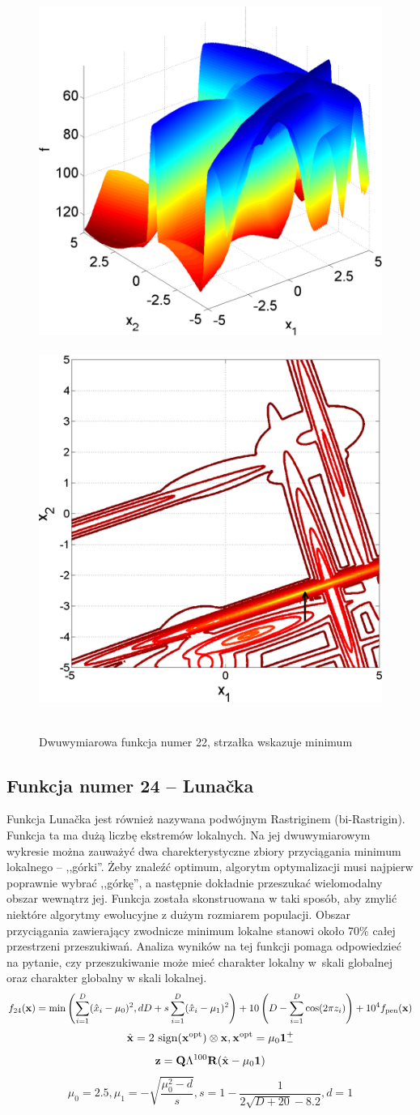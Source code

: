 \documentclass[a4paper,onecolumn,oneside,12pt,wide,floatssmall]{mwrep}
\theoremstyle{definition}
\theoremstyle{plain}%
\theoremstyle{remark}
\begin{document}
\begin{figure}[H]
\centering
\mbox{
\includegraphics[width=.45\textwidth]{img/22.png} \quad
\includegraphics[width=.45\textwidth]{img/22a.png} 
}
\caption{Dwuwymiarowa funkcja numer 22, strzałka wskazuje minimum \cite{noiseless}}
\end{figure}

\subsection{Funkcja numer 24 -- Lunačka}

Funkcja Lunačka jest również nazywana podwójnym Rastriginem (bi-Rastrigin). Funkcja ta ma dużą liczbę ekstremów lokalnych. 
Na jej dwuwymiarowym wykresie można zauważyć dwa charekterystyczne zbiory przyciągania 
minimum lokalnego -- ,,górki''. 
Żeby znaleźć optimum, algorytm optymalizacji musi najpierw poprawnie wybrać ,,górkę'',
a następnie dokładnie przeszukać wielomodalny obszar wewnątrz jej. Funkcja została skonstruowana w taki sposób, aby zmylić
niektóre algorytmy ewolucyjne z dużym rozmiarem populacji. Obszar przyciągania zawierający zwodnicze
minimum lokalne stanowi około 70\% całej przestrzeni przeszukiwań.
Analiza wyników na tej funkcji pomaga odpowiedzieć na pytanie,
czy przeszukiwanie może mieć charakter lokalny w~skali globalnej 
oraz charakter globalny w skali lokalnej.
$$ f_{24}(\bold{x}) = \min \left( \sum^D_{i=1}(\hat{x}_i - \mu_0)^2, dD + s \sum^D_{i=1}(\hat{x}_i - \mu_1)^2 \right) + 10 \left( D - \sum^D_{i=1} \cos(2 \pi z_i) \right) + 10^4 f_\text{pen}(\bold{x}) $$
$$ \hat{\bold{x}} = 2 \text{ sign}(\bold{x}^{\text{opt}}) \otimes \bold{x}, \bold{x}^{\text{opt}} = \mu_0 \bold{1}_-^+ $$
$$ \bold{z} = \bold{Q}\Lambda^{100}\bold{R}(\hat{\bold{x}} - \mu_0\bold{1}) $$
$$ \mu_0 = 2.5, \mu_1 = -\sqrt{\frac{\mu_0^2-d}{s}}, s = 1 - \frac{1}{2\sqrt{D+20}-8.2}, d=1 $$
\end{document}
